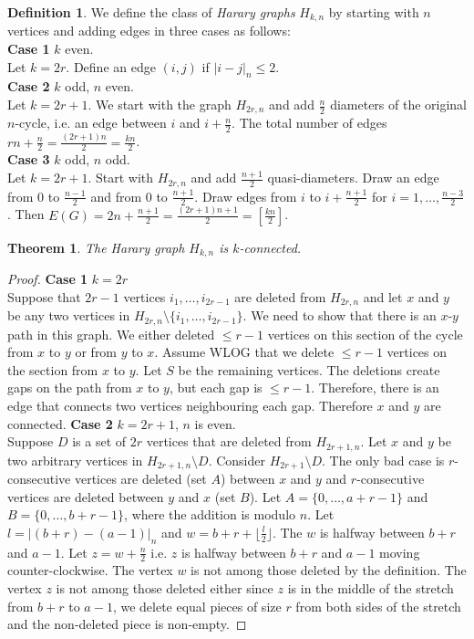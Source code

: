 \documentclass{article}
\newtheorem*{thm}{Theorem}
\theoremstyle{definition}
\newtheorem*{defn}{Definition}
\begin{document}
\begin{defn}
We define the class of \emph{Harary graphs} $H_{k,n}$ by starting with $n$ vertices and adding edges in three cases as follows: \\
\textbf{Case 1} $k$ even. \\
Let $k=2r$.
Define an edge $(i,j)$ if $|i-j|_n \le 2$. \\
\textbf{Case 2} $k$ odd, $n$ even. \\
Let $k=2r+1$.
We start with the graph $H_{2r,n}$ and add $\frac{n}{2}$ diameters of the original $n$-cycle, i.e. an edge between $i$ and $i+\frac{n}{2}$.
The total number of edges $rn +\frac{n}{2} = \frac{(2r+1)n}{2} = \frac{kn}{2}$.\\
\textbf{Case 3} $k$ odd, $n$ odd. \\
Let $k = 2r+1$.
Start with $H_{2r,n}$ and add $\frac{n+1}{2}$ quasi-diameters.
Draw an edge from 0 to $\frac{n-1}{2}$ and from 0 to $\frac{n+1}{2}$.
Draw edges from $i$ to $i+\frac{n+1}{2}$ for $i=1,\ldots,\frac{n-3}{2}$.
Then $E(G) = 2n + \frac{n+1}{2} = \frac{(2r+1)n+1}{2} = \left[\frac{kn}{2}\right]$.
\end{defn}

\begin{thm}
The Harary graph $H_{k,n}$ is $k$-connected.
\end{thm}

\begin{proof}
\textbf{Case 1} $k=2r$ \\
Suppose that $2r-1$ vertices $i_1,\ldots,i_{2r-1}$ are deleted from $H_{2r,n}$ and let $x$ and $y$ be any two vertices in $H_{2r,n}\setminus \{i_1,\ldots,i_{2r-1}\}$.
We need to show that there is an $x$-$y$ path in this graph.
We either deleted $\le r-1$ vertices on this section of the cycle from $x$ to $y$ or from $y$ to $x$.
Assume WLOG that we delete $\le r-1$ vertices on the section from $x$ to $y$.
Let $S$ be the remaining vertices.
The deletions create gaps on the path from $x$ to $y$, but each gap is $\le r-1$.
Therefore, there is an edge that connects two vertices neighbouring each gap.
Therefore $x$ and $y$ are connected.
\textbf{Case 2} $k=2r+1$, $n$ is even. \\
Suppose $D$ is a set of $2r$ vertices that are deleted from $H_{2r+1,n}$.
Let $x$ and $y$ be two arbitrary vertices in $H_{2r+1,n}\setminus D$.
Consider $H_{2r+1}\setminus D$.
The only bad case is $r$-consecutive vertices are deleted (set $A$) between $x$ and $y$ and $r$-consecutive vertices are deleted between $y$ and $x$ (set $B$).
Let $A=\{0,\ldots,a+r-1\}$ and $B=\{0,\ldots,b+r-1\}$, where the addition is modulo $n$.
Let $l = |(b+r)-(a-1)|_n$ and $w = b+r + \lfloor \frac{l}{2}\rfloor$.
The $w$ is halfway between $b+r$ and $a-1$.
Let $z=w+\frac{n}{2}$ i.e. $z$ is halfway between $b+r$ and $a-1$ moving counter-clockwise.
The vertex $w$ is not among those deleted by the definition.
The vertex $z$ is not among those deleted either since $z$ is in the middle of the stretch from $b+r$ to $a-1$, we delete equal pieces of size $r$ from both sides of the stretch and the non-deleted piece is non-empty.
\end{proof}
\end{document}
